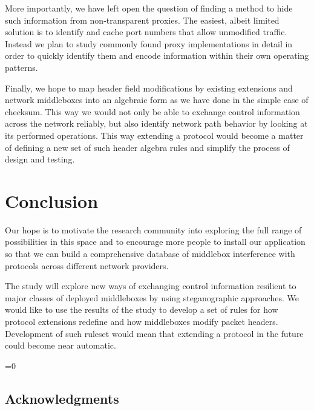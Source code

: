 \documentclass{sig-alternate-10pt}
\def\anon{1}        %
\begin{document}
More importantly, we have left open the question of finding a method to hide such information from non-transparent proxies. The easiest, albeit limited solution is to identify and cache port numbers that allow unmodified traffic. Instead we plan to study commonly found proxy implementations in detail in order to quickly identify them and encode information within their own operating patterns.

Finally, we hope to map header field modifications by existing extensions and network middleboxes into an algebraic form as we have done in the simple case of checksum. This way we would not only be able to exchange control information across the network reliably, but also identify network path behavior by looking at its performed operations. This way extending a protocol would become a matter of defining a new set of such header algebra rules and simplify the process of design and testing.

\section{Conclusion}

Our hope is to motivate the research community into exploring the full range of possibilities in this space and to encourage more people to install our application so that we can build a comprehensive database of middlebox interference with protocols across different network providers.

The study will explore new ways of exchanging control information resilient to major classes of deployed middleboxes by using steganographic approaches. We would like to use the results of the study to develop a set of rules for how protocol extensions redefine and how middleboxes modify packet headers. Development of such ruleset would  mean that extending a protocol in the future could become near automatic.

\ifnum\anon=0
\subsection*{Acknowledgments}

\fi


\clearpage
{


\small 

}

%
\end{document}
